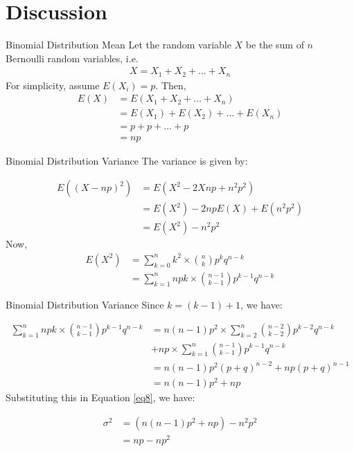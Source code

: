 \documentclass{beamer}
\begin{document}
\section{Discussion}
\begin{frame}{Binomial Distribution Mean}
Let the random variable $X$ be the sum of $n$ Bernoulli random variables, i.e.
\begin{align}
     X = X_1 + X_2 + \ldots +X_n
 \end{align}
 For simplicity, assume $E(X_i) = p$. Then, 
 \begin{align}
     E(X) &= E(X_1 + X_2 + \ldots +X_n) \\
     &= E(X_1) + E(X_2) + \ldots + E(X_n) \\
     &= p + p + \ldots + p \\
     \label{eq5}
     &= np
 \end{align}


\end{frame}


\begin{frame}{Binomial Distribution Variance}
The variance is given by:

 \begin{align}
     E((X-np)^2) &= E(X^2-2Xnp+n^2p^2) \\
     &= E(X^2) -2npE(X) + E(n^2p^2) \\
     \label{eq8}
     &= E(X^2) - n^2p^2 
 \end{align}
 Now,
 \begin{align}
     E(X^2) &= \sum _{k=0} ^n k^2 \times \binom{n}{k} p^k q^{n-k}\\
     &= \sum _{k=1} ^n npk \times \binom{n-1}{k-1} p^{k-1} q^{n-k} 
 \end{align}


\end{frame}

\begin{frame}{Binomial Distribution Variance}
Since $k = (k-1) + 1$, we have:

 \begin{align}
     \sum _{k=1} ^n npk \times \binom{n-1}{k-1} p^{k-1} q^{n-k}  &=  n(n-1)p^2  \times \sum_{k=2} ^n\binom{n-2}{k-2} p^{k-2}q^{n-k}  \nonumber \\&+ np \times \sum_{k=1} ^n \binom{n-1}{k-1} p^{k-1} q^{n-k}\\
     &= n(n-1)p^2  (p+q)^{n-2} + np  (p+q)^{n-1} \\
     &= n(n-1)p^2 + np
 \end{align}
Substituting this in Equation \ref{eq8}, we have:

\begin{align}
    \sigma^2 &= (n(n-1)p^2 + np) -n^2p^2 \\
    &= np - np^2 
\end{align}

\end{frame}
\end{document}
